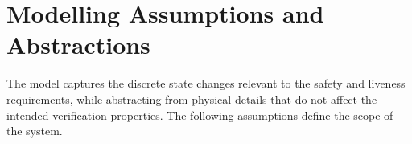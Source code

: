 \section{Modelling Assumptions and Abstractions}
\label{sec:assumptions}

The model captures the discrete state changes relevant to the safety and liveness requirements, while abstracting from physical details that do not affect the intended verification properties. The following assumptions define the scope of the system.


